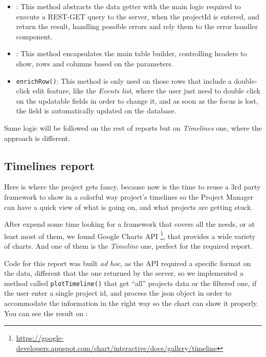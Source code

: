 \begin{itemize}
  \item {}: This method abstracts the data getter with the main
  logic required to execute a REST-GET query to the server, when the projectId
  is entered, and return the result, handling possible errors and rely them to
  the error handler component.
  \item {}: This method encapsulates the main table builder,
  controlling headers to show, rows and columns based on the parameters.
  \item \texttt{enrichRow()}: This method is only used on those rows that
  include a double-click edit feature, like the \emph{Events list}, where the
  user just need to double click on the updatable fields in order to change
  it, and as soon as the focus is lost, the field is automatically updated on
  the database.
\end{itemize}

Same logic will be followed on the rest of reports but on \emph{Timelines} one,
where the approach is different.

\subsection{Timelines report}
Here is where the project gets fancy, because now is the time to reuse a 3rd
party framework to show in a colorful way project's timelines so the Project
Manager can have a quick view of what is going on, and what projects are getting
stuck.

After expend some time looking for a framework that covers all the needs, or at
least most of them, we found Google Charts API
\footnote{\url{https://google-developers.appspot.com/chart/interactive/docs/gallery/timeline}},
that provides a wide variety of charts. And one of them is the \emph{Timeline}
one, perfect for the required report.

Code for this report was built \emph{ad hoc}, as the API required a specific
format on the data, different that the one returned by the server, so we
implemented a method called \texttt{plotTimeline()} that get ``all'' projects data or the
filtered one, if the user enter a single project id, and process the json object
in order to accommodate the information in the right way so the chart can show
it properly. You can see the result on 
:

